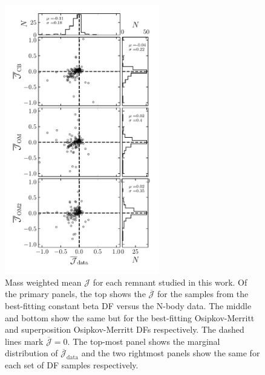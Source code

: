 \begin{figure}
    \centering
    \includegraphics[width=0.6\textwidth]{figure/ch4/J_mean.pdf}
    \caption{Mass weighted mean $\mathcal{J}$ for each remnant studied in this work. Of the primary panels, the top shows the $\overline{\mathcal{J}}$ for the samples from the best-fitting constant beta DF versus the N-body data. The middle and bottom show the same but for the best-fitting Osipkov-Merritt and superposition Osipkov-Merritt DFs respectively. The dashed lines mark $\overline{\mathcal{J}}=0$. The top-most panel shows the marginal distribution of $\overline{\mathcal{J}}_{\mathrm{data}}$ and the two rightmost panels show the same for each set of DF samples respectively.}
    \label{ch4:fig:J-mean}
\end{figure}

